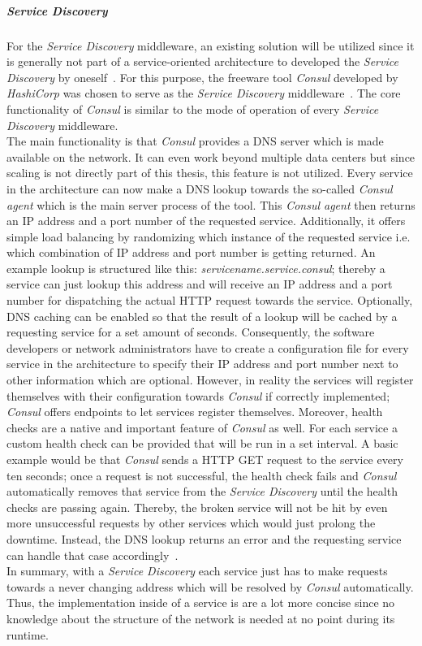 \documentclass[12pt,a4paper,twoside]{report}
\begin{document}
\subparagraph{Service Discovery} \label{subparag:service-discovery}
For the \textit{Service Discovery} middleware, an existing solution will be
utilized since it is generally not part of a service-oriented architecture
to developed the \textit{Service Discovery} by oneself~\cn.
For this purpose, the freeware tool \textit{Consul} developed by \textit{HashiCorp}
was chosen to serve as the \textit{Service Discovery} middleware~\cite{consul}.
The core functionality of \textit{Consul} is similar to the mode of operation
of every \textit{Service Discovery} middleware.\\
The main functionality is that \textit{Consul} provides a DNS server which is
made available on the network. It can even work beyond multiple data centers
but since scaling is not directly part of this thesis, this feature is not utilized.
Every service in the architecture can now make a DNS lookup towards the so-called
\textit{Consul agent} which is the main server process of the tool.
This \textit{Consul agent} then returns an IP address and a
port number of the requested service. Additionally, it offers simple
load balancing by randomizing which instance of the requested service
i.e. which combination of IP address and port number is getting returned.
An example lookup is structured like this: \textit{servicename.service.consul};
thereby a service can just lookup this address and will receive an IP address
and a port number for dispatching the actual HTTP request towards the service.
Optionally, DNS caching can be enabled so that the result of a lookup will be
cached by a requesting service for a set amount of seconds.
Consequently, the software developers or network administrators have to
create a configuration file for every service in the architecture to specify
their IP address and port number next to other information which are optional.
However, in reality the services will register themselves with their configuration
towards \textit{Consul} if correctly implemented;
\textit{Consul} offers endpoints to let services register themselves.
Moreover, health checks are a native and important feature of \textit{Consul}
as well. For each service a custom health check can be provided that
will be run in a set interval. A basic example would be that \textit{Consul}
sends a HTTP GET request to the service every ten seconds;
once a request is not successful, the health check fails and \textit{Consul}
automatically removes that service from the \textit{Service Discovery}
until the health checks are passing again. Thereby, the broken service will
not be hit by even more unsuccessful requests by other services which would just
prolong the downtime. Instead, the DNS lookup returns an error and the
requesting service can handle that case accordingly~\cite{consul}.\\
In summary, with a \textit{Service Discovery} each service just has to
make requests towards a never changing address which will be resolved by
\textit{Consul} automatically. Thus, the implementation inside of a service is
are a lot more concise since no knowledge about the structure of the network
is needed at no point during its runtime.
\end{document}
